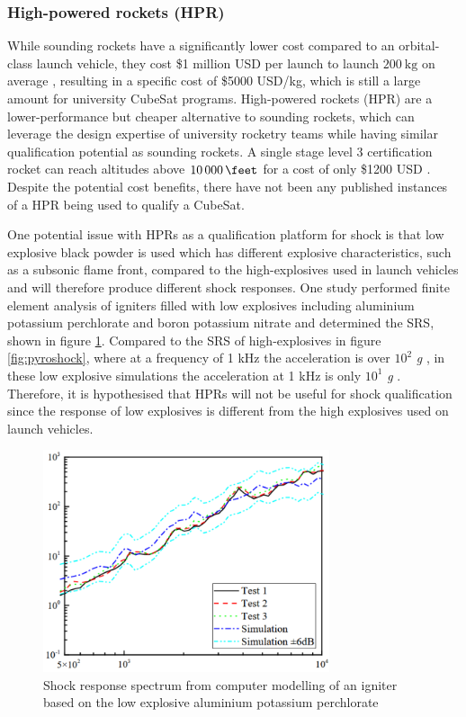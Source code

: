 \documentclass[a4paper,11pt]{article}
\begin{document}
\subsubsection{High-powered rockets (HPR)}
While sounding rockets have a significantly lower cost compared to an orbital-class launch vehicle, they cost \$1 million USD per launch to launch $\SI{200}{\kilo\gram}$ on average \cite{jurist2009commercial}, resulting in a specific cost of \$5000 USD/kg, which is still a large amount for university CubeSat programs. High-powered rockets (HPR) are a lower-performance but cheaper alternative to sounding rockets, which can leverage the design expertise of university rocketry teams while having similar qualification potential as sounding rockets. A single stage level 3 certification rocket can reach altitudes above $\SI{10000}{\feet}$ \cite{canepa2005modern} for a cost of only \$1200 USD \cite{canepa2005modern}. Despite the potential cost benefits, there have not been any published instances of a HPR being used to qualify a CubeSat.

One potential issue with HPRs as a qualification platform for shock is that low explosive black powder is used \cite{canepa2005modern} which has different explosive characteristics, such as a subsonic flame front, compared to the high-explosives used in launch vehicles \cite{bement1995manual} and will therefore produce different shock responses. One study \cite{wang2023numerical} performed finite element analysis of igniters filled with low explosives including aluminium potassium perchlorate and boron potassium nitrate and determined the SRS, shown in figure \ref{fig:lowsrs}. Compared to the SRS of high-explosives in figure \ref{fig:pyroshock}, where at a frequency of 1 kHz the acceleration is over $10^2$ \textit{g} \cite{nasa-pyroshock}, in these low explosive simulations the acceleration at 1 kHz is only $10^1$ \textit{g} \cite{wang2023numerical}. Therefore, it is hypothesised that HPRs will not be useful for shock qualification since the response of low explosives is different from the high explosives used on launch vehicles.


\begin{figure}[H]
  \centering
  \includegraphics[width=0.75\textwidth]{images/deflagration.png}
  \caption{Shock response spectrum from computer modelling of an igniter based on the low explosive aluminium potassium perchlorate \cite{wang2023numerical}}
  \label{fig:lowsrs}
\end{figure}
\end{document}
